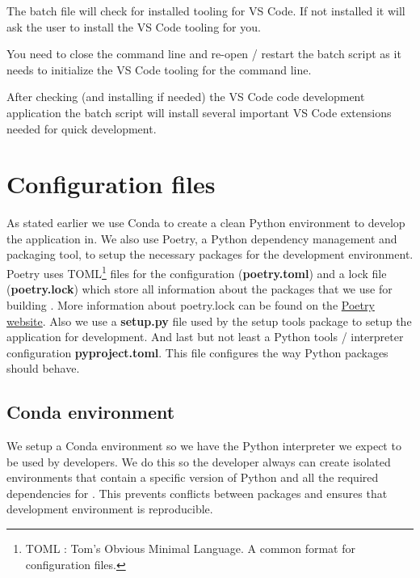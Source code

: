 The batch file will check for installed tooling for VS Code.
If not installed it will ask the user to install the VS Code tooling for you. 

\begin{Note}
You need to close the command line and re-open / restart the batch script as it needs to initialize the VS Code tooling for the command line.
\end{Note}

After checking (and installing if needed) the VS Code code development application the batch script will install several important VS Code extensions needed for quick development.

\section{Configuration files}
As stated earlier we use Conda to create a clean Python environment to develop the \dfastmi application in.
We also use Poetry, a Python dependency management and packaging tool, to setup the necessary packages for the development environment.
Poetry uses TOML\footnote{TOML : Tom's Obvious Minimal Language. A common format for configuration files.} files for the configuration (\textbf{poetry.toml}) and a lock file (\textbf{poetry.lock}) which store all information about the packages that we use for building \dfastmi.
More information about poetry.lock can be found on the \href{https://python-poetry.org/docs/basic-usage/#installing-without-poetrylock}{Poetry website}.
Also we use a \textbf{setup.py} file used by the setup tools package to setup the application for development.
And last but not least a Python tools / interpreter configuration \textbf{pyproject.toml}.
This file configures the way Python packages should behave.

\subsection{Conda environment}
We setup a Conda environment so we have the Python interpreter we expect to be used by developers.
We do this so the developer always can create isolated environments that contain a specific version of Python and all the required dependencies for \dfmi.
This prevents conflicts between packages and ensures that \dfmi development environment is reproducible.

